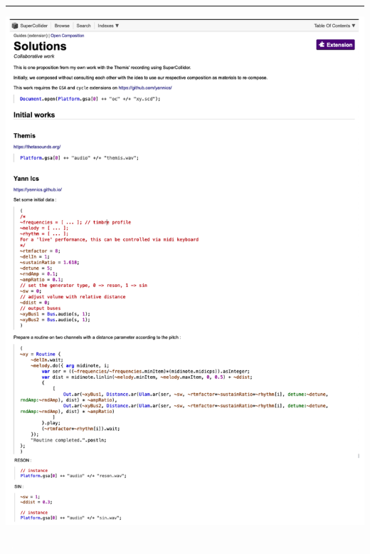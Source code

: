\begin{center}\rule{0.5\linewidth}{0.5pt}\end{center}

\newpage



%
%
\vspace{4mm}

\includegraphics[width=\textwidth]{mp/img/S1}

\newpage
\textcolor{white}{...}
\vspace{4mm}

